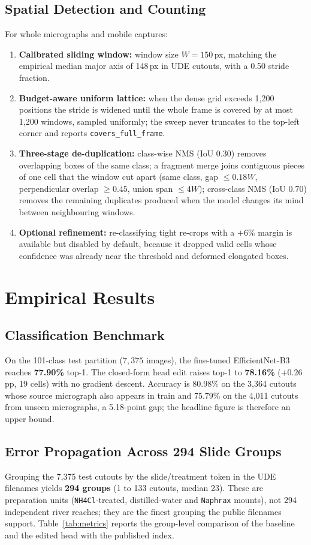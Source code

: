 \documentclass[10pt,twocolumn,a4paper]{article}
\begin{document}
\subsection{Spatial Detection and Counting}
For whole micrographs and mobile captures:
\begin{enumerate}
    \item \textbf{Calibrated sliding window:} window size $W = 150$\,px, matching the empirical median major axis of 148\,px in UDE cutouts, with a 0.50 stride fraction.
    \item \textbf{Budget-aware uniform lattice:} when the dense grid exceeds 1,200 positions the stride is widened until the whole frame is covered by at most 1,200 windows, sampled uniformly; the sweep never truncates to the top-left corner and reports \texttt{covers\_full\_frame}.
    \item \textbf{Three-stage de-duplication:} class-wise NMS (IoU 0.30) removes overlapping boxes of the same class; a fragment merge joins contiguous pieces of one cell that the window cut apart (same class, gap $\le 0.18W$, perpendicular overlap $\ge 0.45$, union span $\le 4W$); cross-class NMS (IoU 0.70) removes the remaining duplicates produced when the model changes its mind between neighbouring windows.
    \item \textbf{Optional refinement:} re-classifying tight re-crops with a $+6\%$ margin is available but disabled by default, because it dropped valid cells whose confidence was already near the threshold and deformed elongated boxes.
\end{enumerate}

\section{Empirical Results}

\subsection{Classification Benchmark}
On the 101-class test partition ($7,375$ images), the fine-tuned EfficientNet-B3 reaches \textbf{77.90\%} top-1. The closed-form head edit raises top-1 to \textbf{78.16\%} ($+0.26$\,pp, 19 cells) with no gradient descent. Accuracy is 80.98\% on the 3,364 cutouts whose source micrograph also appears in train and 75.79\% on the 4,011 cutouts from unseen micrographs, a 5.18-point gap; the headline figure is therefore an upper bound.

\subsection{Error Propagation Across 294 Slide Groups}
Grouping the 7,375 test cutouts by the slide/treatment token in the UDE filenames yields \textbf{294 groups} (1 to 133 cutouts, median 23). These are preparation units (\texttt{NH4Cl}-treated, distilled-water and \texttt{Naphrax} mounts), not 294 independent river reaches; they are the finest grouping the public filenames support. Table~\ref{tab:metrics} reports the group-level comparison of the baseline and the edited head with the published index.
\end{document}
